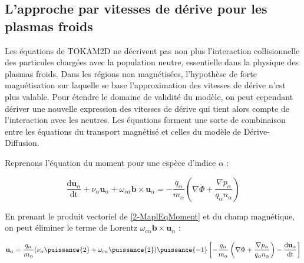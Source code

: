 
\label{AnnexeC}

\begin{refsection}
\section*{L'approche par vitesses de dérive pour les plasmas
froids}
\label{vitessesDerivePlasmaFroid}
Les équations de TOKAM2D ne décrivent
pas non plus l'interaction collisionnelle des particules chargées avec la
population neutre, essentielle dans la physique des plasmas froids. Dans les
régions non magnétisées, l'hypothèse de forte magnétisation sur laquelle se
base l'approximation des vitesses de dérive n'est plus valable. Pour étendre le
domaine de validité du modèle, on peut cependant dériver une nouvelle
expression des vitesses de dérive qui tient alors compte de l'interaction
avec les neutres. Les équations forment une sorte de combinaison entre les
équations du transport magnétisé et celles du modèle de Dérive-Diffusion.

Reprenons l'équation du moment pour une espèce d'indice $\alpha$ :

\begin{equation}
\label{2-MaplEqMoment}
\frac{\text{d}\mathbf{u}_\alpha}{\text{dt}}+
\nu_\alpha\mathbf{u}_\alpha+\omega_{c\alpha}\mathbf{b}\times\mathbf{u}_\alpha=
-\frac{q_\alpha}{m_\alpha}\left(\nabla \Phi +\frac{\nabla p_\alpha}{q_\alpha n_\alpha}\right)
\end{equation}

En prenant le produit vectoriel de \eqref{2-MaplEqMoment} et du champ
magnétique,  on peut éliminer le terme de
Lorentz $\omega_{c\alpha}\mathbf{b}\times\mathbf{u}_\alpha$ :

\begin{equation}
\label{2-MaplVitesse}
\mathbf{u}_\alpha=\frac{q_\alpha}{m_\alpha}(\nu_\alpha\puissance{2}+\omega_{c\alpha}\puissance{2})\puissance{-1}
\left[-\frac{q_\alpha}{m_\alpha}\left(\nabla \Phi +\frac{\nabla
p_\alpha}{q_\alpha
n_\alpha}\right)-\frac{\text{d}\mathbf{u}_\alpha}{\text{dt}}\right]
\end{equation}


\end{refsection}
